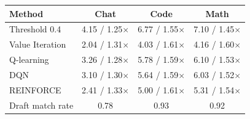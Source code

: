 \begin{tabular}{@{}lccc@{}}
\toprule
Method & Chat & Code & Math \\
\midrule
Threshold 0.4 & 4.15 / 1.25$\times$ & 6.77 / 1.55$\times$ & 7.10 / 1.45$\times$ \\
Value Iteration & 2.04 / 1.31$\times$ & 4.03 / 1.61$\times$ & 4.16 / 1.60$\times$ \\
Q-learning & 3.26 / 1.28$\times$ & 5.78 / 1.59$\times$ & 6.10 / 1.53$\times$ \\
DQN & 3.10 / 1.30$\times$ & 5.64 / 1.59$\times$ & 6.03 / 1.52$\times$ \\
REINFORCE & 2.41 / 1.33$\times$ & 5.00 / 1.61$\times$ & 5.31 / 1.54$\times$ \\
\midrule
Draft match rate & 0.78 & 0.93 & 0.92 \\
\bottomrule
\end{tabular}